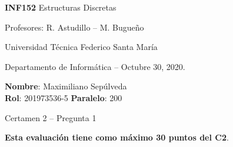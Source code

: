 \documentclass[letterpaper,10pt]{article}
\begin{document}
\thispagestyle{empty}

\begin{minipage}[t]{0.6\textwidth}

{\LARGE \textbf{INF152} Estructuras Discretas}

{\large Profesores: R. Astudillo -- M. Bugueño}

Universidad Técnica Federico Santa María

Departamento de Informática -- Octubre 30, 2020.

\end{minipage}
\hfill
\begin{minipage}[t]{0.35\textwidth}
\textbf{Nombre}: Maximiliano Sepúlveda \\[0.3cm]
\textbf{Rol}: 201973536-5 \textbf{Paralelo}: 200
\end{minipage}

\vspace{0.8cm}

{\Large Certamen 2 -- Pregunta 1}

\vspace{0.4cm}

\textbf{Esta evaluación tiene como máximo 30 puntos del C2}.
\end{document}
